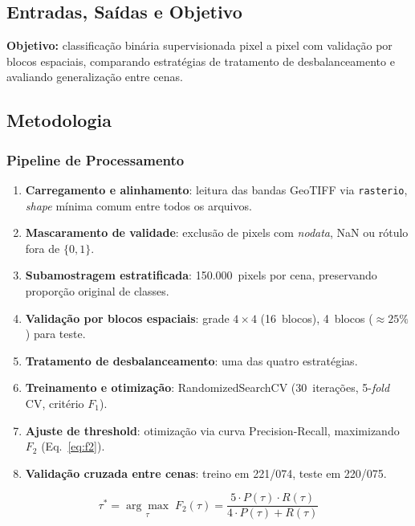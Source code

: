 \documentclass[conference]{IEEEtran}
\begin{document}
\subsection{Entradas, Saídas e Objetivo}

\textbf{Objetivo:} classificação binária supervisionada pixel a pixel
com validação por blocos espaciais, comparando estratégias de tratamento
de desbalanceamento e avaliando generalização entre cenas.

\subsection{Metodologia}

\subsubsection{Pipeline de Processamento}

\begin{enumerate}
  \item \textbf{Carregamento e alinhamento}: leitura das bandas GeoTIFF via
        \texttt{rasterio}, \textit{shape} mínima comum entre todos os arquivos.
  \item \textbf{Mascaramento de validade}: exclusão de pixels com
        \textit{nodata}, NaN ou rótulo fora de $\{0,1\}$.
  \item \textbf{Subamostragem estratificada}: 150.000~pixels por cena,
        preservando proporção original de classes.
  \item \textbf{Validação por blocos espaciais}: grade $4\times4$
        (16~blocos), 4~blocos ($\approx25\%$) para teste.
  \item \textbf{Tratamento de desbalanceamento}: uma das quatro estratégias.
  \item \textbf{Treinamento e otimização}: RandomizedSearchCV (30~iterações,
        5-\textit{fold} CV, critério $F_1$).
  \item \textbf{Ajuste de threshold}: otimização via curva Precision-Recall,
        maximizando $F_2$ (Eq.~\ref{eq:f2}).
  \item \textbf{Validação cruzada entre cenas}: treino em 221/074,
        teste em 220/075.
\end{enumerate}

\begin{equation}
  \tau^* = \underset{\tau}{\arg\max}\;
  F_2(\tau) = \frac{5 \cdot P(\tau) \cdot R(\tau)}
                   {4 \cdot P(\tau) + R(\tau)}
  \label{eq:f2}
\end{equation}
\end{document}
